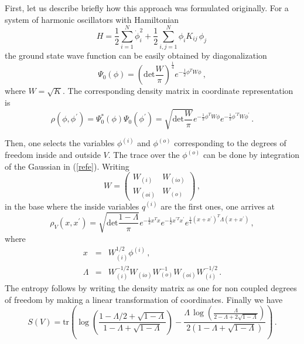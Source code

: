 \documentclass[a4paper]{article}
\begin{document}
First, let us describe briefly how this approach was formulated originally.   For a system of harmonic oscillators with  Hamiltonian
\begin{equation}
H=\frac{1}{2}\sum_{i=1}^N \dot{\phi}_i^2 +\frac{1}{2}\sum_{i,j=1}^N \phi_i K_{ij}\, \phi_j\,\label{hache}
\end{equation}
the ground state wave function can be easily obtained by diagonalization
\begin{equation}
\Psi_0(\phi)=\left(\textrm{det}\frac{W}{\pi}\right)^{\frac{1}{4}}e^{-\frac{1}{2}\phi^T W \phi}\,,
\end{equation}
where $W=\sqrt{K}$.
 The corresponding density matrix in coordinate representation is  
\begin{equation}
\rho(\phi,\phi^\prime)=\Psi_0^*(\phi)\Psi_0(\phi^\prime)=\sqrt{\textrm{det}\frac{W}{\pi}}e^{-\frac{1}{2}\phi^T W \phi} e^{-\frac{1}{2}\phi^{\prime T} W \phi^\prime}\,.\label{refe}
\end{equation}

Then, one selects the variables $\phi^{(i)}$ and $\phi^{(o)}$ corresponding to the degrees of freedom inside and outside $V$. The trace over the $\phi^{(o)}$ can be done by integration of the Gaussian  in (\ref{refe}). Writing
\begin{equation}
W=\left(
\begin{array}{cc}
W_{(i)} & W_{(io)} \\
W_{(oi)} & W_{(o)}
\end{array} 
\right)\,,
\end{equation}   
in the base where the inside variables $q^{(i)}$ are the first ones, one arrives at
\begin{equation}
\rho_V(x,x^\prime)=\sqrt{\textrm{det}\frac{1-\Lambda}{\pi}}e^{-\frac{1}{2}x^T x} e^{-\frac{1}{2}x^{\prime T} x^\prime} e^{\frac{1}{4} (x+x^\prime)^T \Lambda (x+x^\prime)}\,,
\end{equation}
where  
\begin{eqnarray}
x &=&W_{(i)}^{1/2} \phi^{(i)}\,,\\
\Lambda &=& W_{(i)}^{-1/2} W_{(io)} W_{(o)}^{-1} W_{(oi)}  W_{(i)}^{-1/2}   \,.\label{baba}
\end{eqnarray}
The entropy follows by writing the density matrix as one for non coupled degrees of freedom by making a linear transformation of coordinates. Finally we have
\begin{equation}
S(V)=\textrm{tr} \left(\log (\frac{1-\Lambda/2+\sqrt{1-\Lambda}}{1-\Lambda+\sqrt{1-\Lambda}})-\frac{\Lambda\, \log \left(\frac{\Lambda}{2-\Lambda+2\sqrt{1-\Lambda}}\right)}{2 (1-\Lambda+\sqrt{1-\Lambda})}\right)\,.\label{la}
\end{equation}
\end{document}
